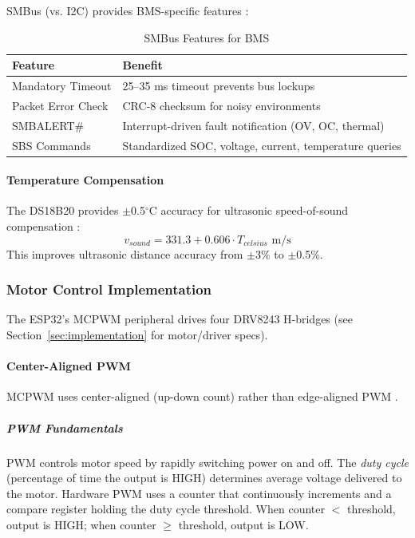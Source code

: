 SMBus (vs. I2C) provides BMS-specific features \parencite{smbus_spec, analog_i2c_smbus}:

\begin{table}[H]
\centering
\caption{SMBus Features for BMS}
\begin{tabular}{@{}lp{8cm}@{}}
\toprule
\textbf{Feature} & \textbf{Benefit} \\
\midrule
Mandatory Timeout & 25--35 ms timeout prevents bus lockups \\
Packet Error Check & CRC-8 checksum for noisy environments \\
SMBALERT\# & Interrupt-driven fault notification (OV, OC, thermal) \\
SBS Commands & Standardized SOC, voltage, current, temperature queries \\
\bottomrule
\end{tabular}
\end{table}

\paragraph{Temperature Compensation}

The DS18B20 provides $\pm$0.5$^\circ$C accuracy for ultrasonic speed-of-sound compensation \parencite{ds18b20_datasheet}:
\begin{equation}
v_{sound} = 331.3 + 0.606 \cdot T_{celsius} \textrm{ m/s}
\end{equation}
This improves ultrasonic distance accuracy from $\pm$3\% to $\pm$0.5\%.

\subsubsection{Motor Control Implementation}

The ESP32's MCPWM peripheral drives four DRV8243 H-bridges (see Section~\ref{sec:implementation} for motor/driver specs).

\paragraph{Center-Aligned PWM}

MCPWM uses center-aligned (up-down count) rather than edge-aligned PWM \parencite{esp_idf_mcpwm, ti_pwm_techniques}.

\subparagraph{PWM Fundamentals}
PWM controls motor speed by rapidly switching power on and off. The \textit{duty cycle} (percentage of time the output is HIGH) determines average voltage delivered to the motor. Hardware PWM uses a counter that continuously increments and a compare register holding the duty cycle threshold. When counter $<$ threshold, output is HIGH; when counter $\geq$ threshold, output is LOW.

